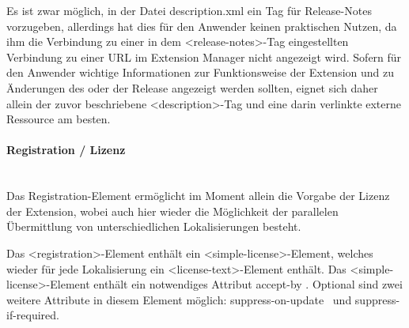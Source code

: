 \documentclass[a4paper,10pt,pagesize,titlepage]{scrbook}
\begin{document}
Es ist zwar möglich, in der Datei description.xml ein Tag für Release-Notes vorzugeben, allerdings hat dies für den Anwender keinen praktischen Nutzen, da ihm die Verbindung zu einer in dem <release-notes>-Tag eingestellten Verbindung zu einer URL im Extension Manager nicht angezeigt wird. Sofern für den Anwender wichtige Informationen zur Funktionsweise der Extension und zu Änderungen des oder der Release angezeigt werden sollten, eignet sich daher allein der zuvor beschriebene <description>-Tag und eine darin verlinkte externe Ressource am besten.

\paragraph*{Registration / Lizenz}$~~$\\

Das Registration-Element ermöglicht im Moment allein die Vorgabe der Lizenz der Extension, wobei auch hier wieder die Möglichkeit der parallelen Übermittlung von unterschiedlichen Lokalisierungen besteht.

Das <registration>-Element enthält ein <simple-license>-Element, welches wieder für jede Lokalisierung ein <license-text>-Element enthält. Das <simple-license>-Element enthält ein notwendiges Attribut \glqq accept-by \grqq . Optional sind zwei weitere Attribute in diesem Element möglich: \glqq suppress-on-update\grqq~ und \glqq suppress-if-required\grqq .\\
\end{document}
